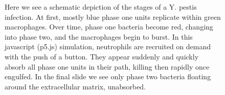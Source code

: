 \begin{figure}[h!]
    \caption{Here we see a schematic depiction of the stages of a Y. pestis infection. At first, mostly blue phase one units replicate within green macrophages. Over time, phase one bacteria become red, changing into phase two, and the macrophages begin to burst. In this javascript (p5.js) simulation, neutrophils are recruited on demand with the push of a button. They appear suddenly and quickly absorb all phase one units in their path, killing then rapidly once engulfed. In the final slide we see only phase two bacteria floating around the extracellular matrix, unabsorbed.}
    \label{fig:two_columns_six_images}
\end{figure}






























